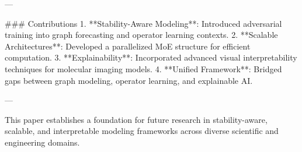 ---

### Contributions
1. **Stability-Aware Modeling**: Introduced adversarial training into graph forecasting and operator learning contexts.
2. **Scalable Architectures**: Developed a parallelized MoE structure for efficient computation.
3. **Explainability**: Incorporated advanced visual interpretability techniques for molecular imaging models.
4. **Unified Framework**: Bridged gaps between graph modeling, operator learning, and explainable AI.

---

This paper establishes a foundation for future research in stability-aware, scalable, and interpretable modeling frameworks across diverse scientific and engineering domains.